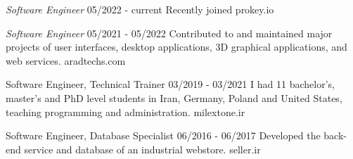 \documentclass[a4paper,12pt]{memoir} %
\begin{document}

\Sep %


\clearpage %

\userinformation %

\framebreak %




{\textit{Software Engineer}}
{05/2022 - current}
{Recently joined}
{prokey.io}


{\textit{Software Engineer}}
{05/2021 - 05/2022}
{Contributed to and maintained major projects of user interfaces, desktop applications, 3D graphical applications, and web services.}
{aradtechs.com}


{Software Engineer, Technical Trainer}
{03/2019 - 03/2021}
{I had 11 bachelor's, master's and PhD level students in Iran, Germany, Poland and United States, teaching programming and administration.}
{milextone.ir}


{Software Engineer, Database Specialist}
{06/2016 - 06/2017}
{Developed the back-end service and database of an industrial webstore.}
{seller.ir}


\Sep %

\end{document}

